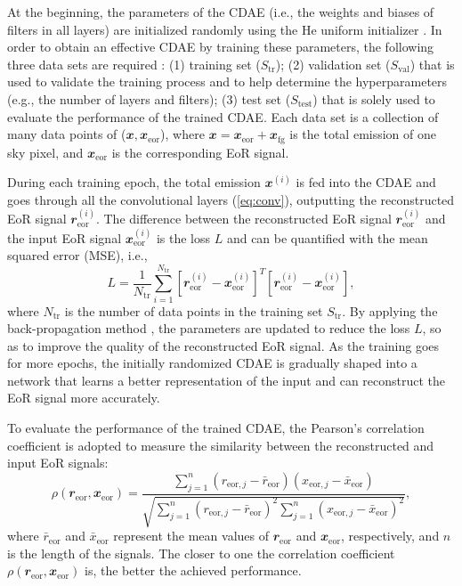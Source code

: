 \documentclass[fleqn,usenatbib]{mnras}
\newcommand{\R}[1]{\mathrm{#1}}
\newcommand{\B}[1]{\mathbfit{#1}}
\begin{document}
At the beginning, the parameters of the CDAE (i.e., the weights and biases
of filters in all layers) are initialized randomly using the He uniform
initializer \citep{he2015}.
In order to obtain an effective CDAE by training these parameters, the
following three data sets are required \citep[e.g.,][]{ripley1996}:
(1) training set ($S_{\R{tr}}$);
(2) validation set ($S_{\R{val}}$) that is used to validate the training
process and to help determine the hyperparameters (e.g., the number of
layers and filters);
(3) test set ($S_{\R{test}}$) that is solely used to evaluate the
performance of the trained CDAE.
Each data set is a collection of many data points of
($\B{x}, \B{x}_{\R{eor}}$),
where $\B{x} = \B{x}_{\R{eor}} + \B{x}_{\R{fg}}$ is the total emission of
one sky pixel, and $\B{x}_{\R{eor}}$ is the corresponding EoR signal.

During each training epoch, the total emission $\B{x}^{(i)}$ is fed into
the CDAE and goes through all the convolutional layers (\autoref{eq:conv}),
outputting the reconstructed EoR signal $\B{r}^{(i)}_{\R{eor}}$.
The difference between the reconstructed EoR signal $\B{r}^{(i)}_{\R{eor}}$
and the input EoR signal $\B{x}^{(i)}_{\R{eor}}$ is the loss $L$ and can be
quantified with the mean squared error (MSE), i.e.,
\begin{equation}
  \label{eq:loss}
  L = \frac{1}{N_{\R{tr}}} \sum_{i=1}^{N_{\R{tr}}}
    \left[ \B{r}_{\R{eor}}^{(i)} - \B{x}_{\R{eor}}^{(i)} \right]^T
    \left[ \B{r}_{\R{eor}}^{(i)} - \B{x}_{\R{eor}}^{(i)} \right],
\end{equation}
where $N_{\R{tr}}$ is the number of data points in the training set
$S_{\R{tr}}$.
By applying the back-propagation method
\citep[e.g.,][]{rumelhart1986,lecun1998bp},
the parameters are updated to reduce the loss $L$, so as to
improve the quality of the reconstructed EoR signal.
As the training goes for more epochs, the initially randomized CDAE is
gradually shaped into a network
that learns a better representation of the input and can
reconstruct the EoR signal more accurately.

To evaluate the performance of the trained CDAE,
the Pearson's correlation coefficient
\citep[e.g.,][]{harker2009,chapman2013}
is adopted to measure the similarity between the reconstructed and input
EoR signals:
\begin{equation}
  \label{eq:corrcoef}
  \rho(\B{r}_{\R{eor}}, \B{x}_{\R{eor}})
      = \frac{\sum_{j=1}^{n}(r_{\R{eor},j} - \bar{r}_{\R{eor}})
      (x_{\R{eor},j} - \bar{x}_{\R{eor}})}{
        \sqrt{\sum_{j=1}^{n}(r_{\R{eor},j} - \bar{r}_{\R{eor}})^2
          \sum_{j=1}^{n}(x_{\R{eor},j} - \bar{x}_{\R{eor}})^2}
    },
\end{equation}
where
$\bar{r}_{\R{eor}}$ and $\bar{x}_{\R{eor}}$ represent the mean
values of $\B{r}_{\R{eor}}$ and $\B{x}_{\R{eor}}$, respectively, and $n$
is the length of the signals.
The closer to one the correlation coefficient
$\rho(\B{r}_{\R{eor}}, \B{x}_{\R{eor}})$ is,
the better the achieved performance.
\end{document}
